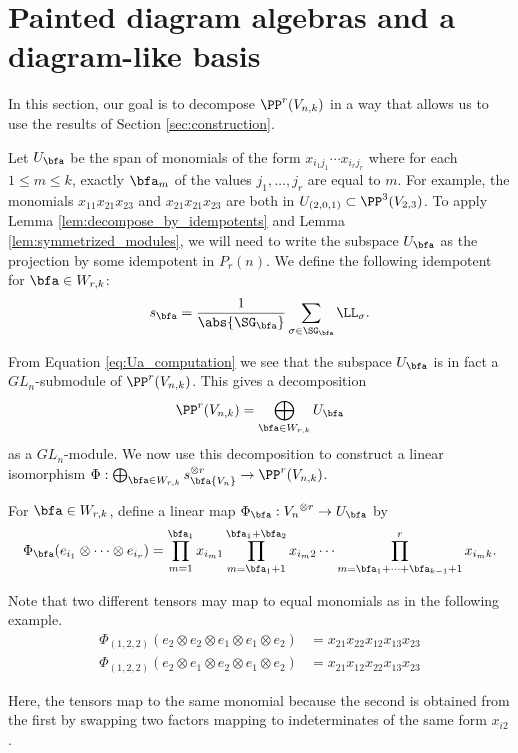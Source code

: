 \section{Painted diagram algebras and a diagram-like basis}\label{sec:diagram_like_basis}

In this section, our goal is to decompose $\PP^r(V_{n,k})$ in a way that allows us to use the results of Section \ref{sec:construction}.

Let $U_\bfa$ be the span of monomials of the form $x_{i_1j_1}\cdots x_{i_rj_r}$ where for each $1\leq m\leq k$, exactly $\bfa_m$ of the values $j_1,\dots,j_r$ are equal to $m$. For example, the monomials $x_{11}x_{21}x_{23}$ and $x_{21}x_{21}x_{23}$ are both in $U_{(2,0,1)}\subset \PP^3(V_{2,3})$.  To apply Lemma \ref{lem:decompose_by_idempotents} and Lemma \ref{lem:symmetrized_modules}, we will need to write the subspace $U_\bfa$ as the projection by some idempotent in $P_r(n)$. We define the following idempotent for $\bfa\in W_{r,k}$: \[s_\bfa=\frac{1}{\abs{\SG_\bfa}}\sum_{\sigma\in\SG_\bfa}\LL_\sigma.\]

From Equation \ref{eq:Ua_computation} we see that the subspace $U_\bfa$ is in fact a $GL_n$-submodule of $\PP^r(V_{n,k})$. This gives a decomposition \[\PP^r(V_{n,k})=\bigoplus_{\bfa\in W_{r,k}}U_\bfa\] as a $GL_n$-module. We now use this decomposition to construct a linear isomorphism $\Phi:\bigoplus_{\bfa\in W_{r,k}}s_\bfa {V_n}^{\otimes r}\to \PP^r(V_{n,k})$.

For $\bfa\in W_{r,k}$, define a linear map $\Phi_\bfa:{V_n}^{\otimes r}\to U_\bfa$ by \[\Phi_\bfa(e_{i_1}\otimes\dots\otimes e_{i_r})=\prod_{m=1}^{\bfa_1}x_{i_m1}\prod_{m=\bfa_1+1}^{\bfa_1+\bfa_2}x_{i_m2}\dots \prod_{m=\bfa_1+\dots+\bfa_{k-1}+1}^{r}x_{i_mk}.\]

\begin{exam} Note that two different tensors may map to equal monomials as in the following example.
    \begin{align*}
        \Phi_{(1,2,2)}(e_2\otimes e_2\otimes e_1\otimes e_1\otimes e_2)&=x_{21}x_{22}x_{12}x_{13}x_{23}\\
        \Phi_{(1,2,2)}(e_2\otimes e_1\otimes e_2\otimes e_1\otimes e_2)&=x_{21}x_{12}x_{22}x_{13}x_{23}
    \end{align*}

    Here, the tensors map to the same monomial because the second is obtained from the first by swapping two factors mapping to indeterminates of the same form $x_{i2}$.
\end{exam}

